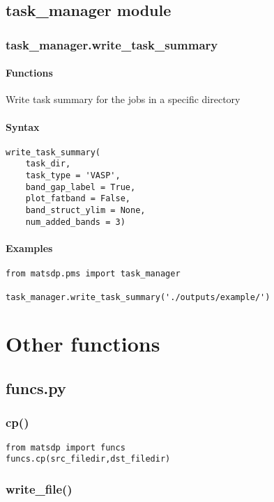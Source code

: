 \documentclass[12pt]{book}
\begin{document}
\section{task\_manager module}

\subsection{task\_manager.write\_task\_summary}
\subsubsection{Functions}
Write task summary for the jobs in a specific directory
\subsubsection{Syntax}
\begin{lstlisting}
write_task_summary(
    task_dir, 
    task_type = 'VASP', 
    band_gap_label = True, 
    plot_fatband = False, 
    band_struct_ylim = None, 
    num_added_bands = 3)
\end{lstlisting}
\subsubsection{Examples}
\begin{lstlisting}
from matsdp.pms import task_manager

task_manager.write_task_summary('./outputs/example/')
\end{lstlisting}

\chapter{Other functions}
\section{funcs.py}

\subsection{cp()}

\begin{lstlisting}
from matsdp import funcs
funcs.cp(src_filedir,dst_filedir)
\end{lstlisting}

\subsection{write\_file()}
\end{document}
